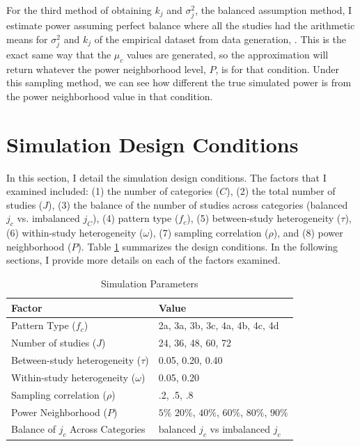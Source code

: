 For the third method of obtaining $k_j$ and $\sigma_j^2$, the balanced assumption method, I estimate power assuming perfect balance where all the studies had the arithmetic means for $\sigma_j^2$ and $k_j$ of the empirical dataset from data generation, \textcite{WilliamsRyan2022HiMI}. This is the exact same way that the $\mu_c$ values are generated, so the approximation will return whatever the power neighborhood level, $P$,  is for that condition. Under this sampling method, we can see how different the true simulated power is from the power neighborhood value in that condition. 

\section{Simulation Design Conditions}\label{sec:simulationdesgin}

In this section, I detail the simulation design conditions. The factors that I examined included: (1) the number of categories ($C$), (2) the total number of studies ($J$), (3) the balance of the number of studies across categories (balanced $j_c$ vs. imbalanced $j_C$), (4) pattern type ($f_c$), (5) between-study heterogeneity ($\tau$), (6) within-study heterogeneity ($\omega$), (7) sampling correlation ($\rho$), and (8) power neighborhood ($P$). Table \ref{tab:experimentalconditions} summarizes the design conditions. In the following sections, I provide more details on each of the factors examined. 


\begin{table}[H]
\caption{Simulation Parameters}
     \label{tab:experimentalconditions}
    \centering
    \begin{tabular}{p{7cm}p{7cm}}
        \toprule
    Factor & Value \\ \midrule

       Pattern Type ($f_c$)  & 2a, 3a, 3b, 3c, 4a, 4b, 4c, 4d \\
       Number of studies ($J$)  & 24, 36, 48, 60, 72  \\ 
       Between-study heterogeneity ($\tau$)  & 0.05, 0.20, 0.40 \\
       Within-study heterogeneity ($\omega$) & 0.05, 0.20 \\
       Sampling correlation ($\rho$) & .2, .5, .8 \\
       Power Neighborhood ($P$) & $5\%$ $20\%$, $40\%$, $60\%$, $80\%$, $90\%$ \\
       Balance of $j_c$ Across Categories & balanced $j_c$ vs imbalanced $j_c$ \\
        \bottomrule
    \end{tabular}
    \small
\end{table}


